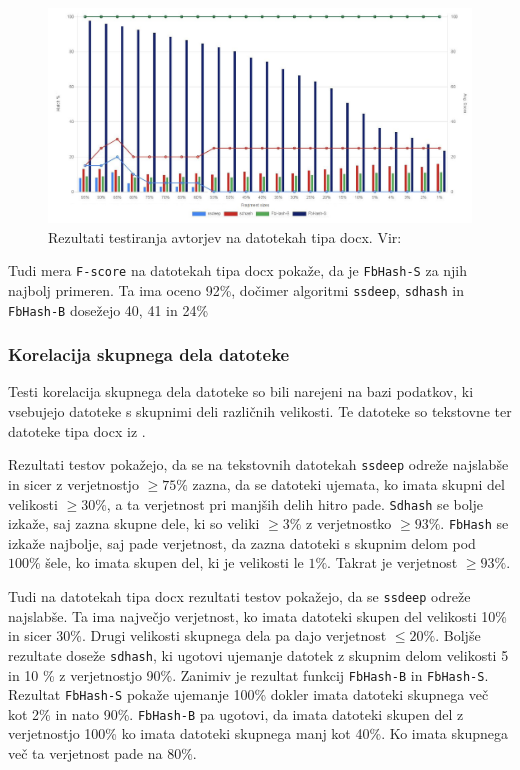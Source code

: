 \documentclass{acm_proc_article-sp}
\begin{document}
\begin{figure}[htb]
\begin{center}
\includegraphics[width=1\columnwidth]{frag_det_docx.png}
\end{center}
\caption{\small{Rezultati testiranja avtorjev na datotekah tipa docx. Vir: \cite{fbhash}}}
\label{fig:fd-docx-rez}
\end{figure}

Tudi mera \texttt{F-score} na datotekah tipa docx pokaže, da je \texttt{FbHash-S} za njih najbolj primeren. Ta ima oceno 92\%, dočimer algoritmi \texttt{ssdeep}, \texttt{sdhash} in \texttt{FbHash-B} dosežejo 40, 41 in 24\%

\subsubsection{Korelacija skupnega dela datoteke}

Testi korelacija skupnega dela datoteke so bili narejeni na bazi podatkov, ki vsebujejo datoteke s skupnimi deli različnih velikosti. Te datoteke so tekstovne ter datoteke tipa docx iz \cite{dataset}. 

Rezultati testov pokažejo, da se na tekstovnih datotekah \texttt{ssdeep} odreže najslabše in sicer z verjetnostjo $\geq 75\%$ zazna, da se datoteki ujemata, ko imata skupni del velikosti $\geq 30\%$, a ta verjetnost pri manjših delih hitro pade. \texttt{Sdhash} se bolje izkaže, saj zazna skupne dele, ki so veliki $\geq 3\%$ z verjetnostko $\geq 93\%$. \texttt{FbHash} se izkaže najbolje, saj pade verjetnost, da zazna datoteki s skupnim delom pod $100\%$ šele, ko imata skupen del, ki je velikosti le $1\%$. Takrat je verjetnost $\geq 93\%$.

Tudi na datotekah tipa docx rezultati testov pokažejo, da se \texttt{ssdeep} odreže najslabše. Ta ima največjo verjetnost, ko imata datoteki skupen del velikosti 10\% in sicer 30\%. Drugi velikosti skupnega dela pa dajo verjetnost $\leq 20\%$. Boljše rezultate doseže \texttt{sdhash}, ki ugotovi ujemanje datotek z skupnim delom velikosti 5 in 10 \% z verjetnostjo 90\%. Zanimiv je rezultat funkcij \texttt{FbHash-B} in \texttt{FbHash-S}. Rezultat \texttt{FbHash-S} pokaže ujemanje 100\% dokler imata datoteki skupnega več kot 2\% in nato 90\%. \texttt{FbHash-B} pa ugotovi, da imata datoteki skupen del z verjetnostjo 100\% ko imata datoteki skupnega manj kot 40\%. Ko imata skupnega več ta verjetnost pade na 80\%.
\end{document}
